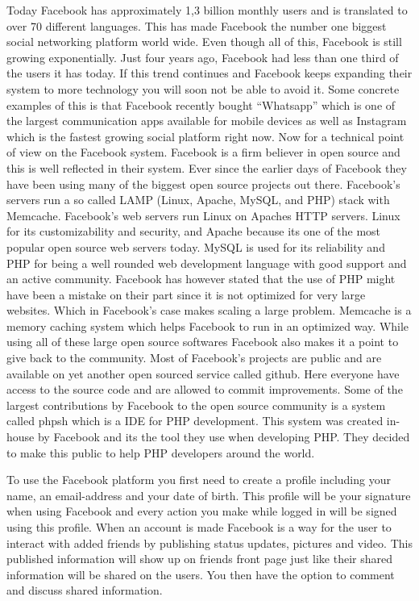 \documentclass[conference]{IEEEtran}
\begin{document}
Today Facebook has approximately 1,3 billion monthly users and is translated to over 70 different languages.\cite{StatisticBrain} This has made Facebook the number one biggest social networking platform world wide. Even though all of this, Facebook is still growing exponentially. Just four years ago, Facebook had less than one third of the users it has today. If this trend continues and Facebook keeps expanding their system to more technology you will soon not be able to avoid it. Some concrete examples of this is that Facebook recently bought “Whatsapp” which is one of the largest communication apps available for mobile devices as well as Instagram which is the fastest growing social platform right now. \cite{KateKnibbs2014}
Now for a technical point of view on the Facebook system. Facebook is a firm believer in open source and this is well reflected in their system. Ever since the earlier days of Facebook they have been using many of the biggest open source projects out there.
Facebook’s servers run a so called LAMP (Linux, Apache, MySQL, and PHP) stack with Memcache. Facebook’s web servers run Linux on Apaches HTTP servers. Linux for its customizability and security, and Apache because its one of the most popular open source web servers today. MySQL is used for its reliability and PHP for being a well rounded web development language with good support and an active community. Facebook has however stated that the use of PHP might have been a mistake on their part since it is not optimized for very large websites. Which in Facebook’s case makes scaling a large problem.
Memcache is a memory caching system which helps Facebook to run in an optimized way.
\cite{SteveKampbel2010}
While using all of these large open source softwares Facebook also makes it a point to give back to the community. Most of Facebook’s projects are public and are available on yet another open sourced service called github. Here everyone have access to the source code and are allowed to commit improvements. Some of the largest contributions by Facebook to the open source community is a system called phpsh which is a IDE for PHP development. This system was created in-house by Facebook and its the tool they use when developing PHP. They decided to make this public to help PHP developers around the world. \cite{SteveGrimm2006}

To use the Facebook platform you first need to create a profile including your name, an email-address and your date of birth. This profile will be your signature when using Facebook and every action you make while logged in will be signed using this profile.
When an account is made Facebook is a way for the user to interact with added friends by publishing status updates, pictures and video. This published information will show up on friends front page just like their shared information will be shared on the users. You then have the option to comment and discuss shared information.
\end{document}
